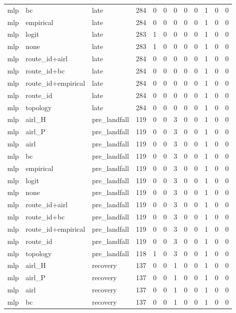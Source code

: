 \begin{tabular}{lllrrrrrrrrr}
mlp & bc & late & 284 & 0 & 0 & 0 & 0 & 0 & 1 & 0 & 0 \\
mlp & empirical & late & 284 & 0 & 0 & 0 & 0 & 0 & 1 & 0 & 0 \\
mlp & logit & late & 283 & 1 & 0 & 0 & 0 & 0 & 1 & 0 & 0 \\
mlp & none & late & 283 & 1 & 0 & 0 & 0 & 0 & 1 & 0 & 0 \\
mlp & route_id+airl & late & 284 & 0 & 0 & 0 & 0 & 0 & 1 & 0 & 0 \\
mlp & route_id+bc & late & 284 & 0 & 0 & 0 & 0 & 0 & 1 & 0 & 0 \\
mlp & route_id+empirical & late & 284 & 0 & 0 & 0 & 0 & 0 & 1 & 0 & 0 \\
mlp & route_id & late & 284 & 0 & 0 & 0 & 0 & 0 & 1 & 0 & 0 \\
mlp & topology & late & 284 & 0 & 0 & 0 & 0 & 0 & 1 & 0 & 0 \\
mlp & airl_H & pre_landfall & 119 & 0 & 0 & 3 & 0 & 0 & 1 & 0 & 0 \\
mlp & airl_P & pre_landfall & 119 & 0 & 0 & 3 & 0 & 0 & 1 & 0 & 0 \\
mlp & airl & pre_landfall & 119 & 0 & 0 & 3 & 0 & 0 & 1 & 0 & 0 \\
mlp & bc & pre_landfall & 119 & 0 & 0 & 3 & 0 & 0 & 1 & 0 & 0 \\
mlp & empirical & pre_landfall & 119 & 0 & 0 & 3 & 0 & 0 & 1 & 0 & 0 \\
mlp & logit & pre_landfall & 119 & 0 & 0 & 3 & 0 & 0 & 1 & 0 & 0 \\
mlp & none & pre_landfall & 119 & 0 & 0 & 3 & 0 & 0 & 1 & 0 & 0 \\
mlp & route_id+airl & pre_landfall & 119 & 0 & 0 & 3 & 0 & 0 & 1 & 0 & 0 \\
mlp & route_id+bc & pre_landfall & 119 & 0 & 0 & 3 & 0 & 0 & 1 & 0 & 0 \\
mlp & route_id+empirical & pre_landfall & 119 & 0 & 0 & 3 & 0 & 0 & 1 & 0 & 0 \\
mlp & route_id & pre_landfall & 119 & 0 & 0 & 3 & 0 & 0 & 1 & 0 & 0 \\
mlp & topology & pre_landfall & 118 & 1 & 0 & 3 & 0 & 0 & 1 & 0 & 0 \\
mlp & airl_H & recovery & 137 & 0 & 0 & 1 & 0 & 0 & 1 & 0 & 0 \\
mlp & airl_P & recovery & 137 & 0 & 0 & 1 & 0 & 0 & 1 & 0 & 0 \\
mlp & airl & recovery & 137 & 0 & 0 & 1 & 0 & 0 & 1 & 0 & 0 \\
mlp & bc & recovery & 137 & 0 & 0 & 1 & 0 & 0 & 1 & 0 & 0 \\

\end{tabular}
